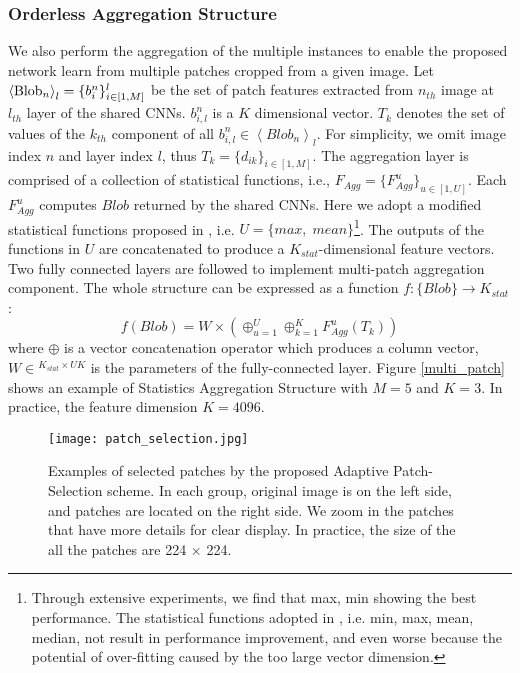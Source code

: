 \documentclass[10pt,twocolumn,letterpaper]{article}
\begin{document}
	\subsubsection{Orderless Aggregation Structure}
	We also perform the aggregation of the multiple instances to enable the proposed network learn from multiple patches cropped from a given image. Let ${\left\langle {{\rm{Blo}}{{\rm{b}}_n}} \right\rangle _{l}} = \{ b_i^n\} _{i \in [1,M]}^{l}$ be the set of patch features extracted from $n_{th}$ image 
	at $l_{th}$ layer of the shared CNNs. $b_{i,l}^n$ is a $K$ dimensional vector.
	$T_k$ denotes the set of values of the $k_{th}$ component of all $b_{i,l}^n \in {\left\langle {Blo{b_n}} \right\rangle _l}$. For simplicity, we omit image index $n$ and layer index $l$, thus ${T_k} = {\{ {d_{ik}}\} _{i \in [1,M]}}$.
	The aggregation layer is comprised of a collection of statistical functions, 
	i.e., ${F_{Agg}} = {\{ F_{Agg}^u\} _{u \in [1,U]}}$. Each $F_{Agg}^u$ computes
	$Blob$ returned by the shared CNNs. Here we adopt a modified statistical functions proposed in \cite{Lu:2015:ICCV}, i.e. $U = \{ max,\;mean\} $\footnote[1]{Through extensive experiments, we find that {max, min} showing the best performance. The statistical functions adopted in \cite{Lu:2015:ICCV}, i.e. {min, max, mean, median}, not result in performance improvement, and even worse because the potential of over-fitting caused by the too large vector dimension.}. The outputs of the functions in $U$ are concatenated to produce a ${K_{stat}}$-dimensional feature vectors. Two fully connected layers are followed to implement multi-patch
	aggregation component. The whole structure can be expressed as a function 
	$f:\{ Blob\}  \to {{{K_{stat}}}}$:
	\begin{equation}
	f(Blob) = W \times ( \oplus _{u = 1}^U \oplus _{k = 1}^KF_{Agg}^u({T_k}))
	\end{equation}
	where $ \oplus$ is a vector concatenation operator which produces a column vector, $W \in {^{{K_{stat}} \times UK}}$ is the parameters of the fully-connected layer. 
	Figure \ref{multi_patch} shows an example of Statistics Aggregation Structure with $M = 5$ and $K=3$. In practice, the feature dimension $K=4096$.
	
	\begin{figure}
		\centering
		\texttt{[image: patch\_selection.jpg]}
		\caption{Examples of selected patches by the proposed Adaptive Patch-Selection scheme. In each group, original image is on the left side, and patches are located on the right side. We zoom in the patches that have more details for clear display. In practice, the size of the all the patches are 224 $\times$ 224. }
		\label{patches}
		\vspace{-3mm}
	\end{figure}
\end{document}
